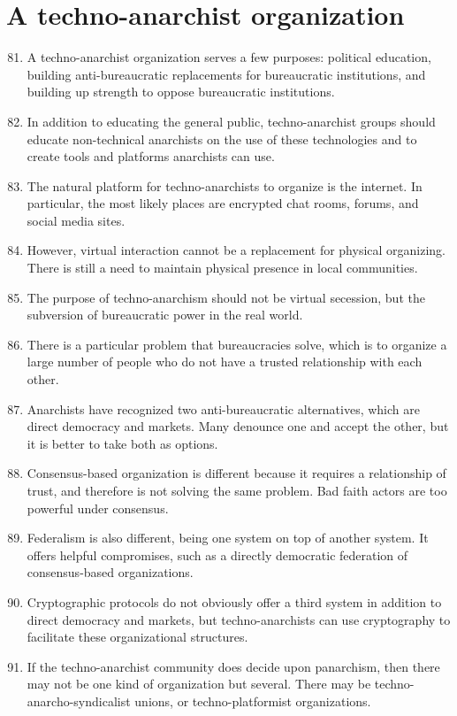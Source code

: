 \documentclass{article}
\begin{document}
\section{A techno-anarchist organization}
\begin{enumerate}
\setcounter{enumi}{80}
\item A techno-anarchist organization serves a few purposes: political education, building anti-bureaucratic replacements for bureaucratic institutions, and building up strength to oppose bureaucratic institutions.
\item In addition to educating the general public, techno-anarchist groups should educate non-technical anarchists on the use of these technologies and to create tools and platforms anarchists can use.
\item The natural platform for techno-anarchists to organize is the internet. In particular, the most likely places are encrypted chat rooms, forums, and social media sites.
\item However, virtual interaction cannot be a replacement for physical organizing. There is still a need to maintain physical presence in local communities.
\item The purpose of techno-anarchism should not be virtual secession, but the subversion of bureaucratic power in the real world.
\item There is a particular problem that bureaucracies solve, which is to organize a large number of people who do not have a trusted relationship with each other.
\item Anarchists have recognized two anti-bureaucratic alternatives, which are direct democracy and markets. Many denounce one and accept the other, but it is better to take both as options.
\item Consensus-based organization is different because it requires a relationship of trust, and therefore is not solving the same problem. Bad faith actors are too powerful under consensus.
\item Federalism is also different, being one system on top of another system. It offers helpful compromises, such as a directly democratic federation of consensus-based organizations.
\item Cryptographic protocols do not obviously offer a third system in addition to direct democracy and markets, but techno-anarchists can use cryptography to facilitate these organizational structures.
\item If the techno-anarchist community does decide upon panarchism, then there may not be one kind of organization but several. There may be techno-anarcho-syndicalist unions, or techno-platformist organizations.

\end{enumerate}
\end{document}
